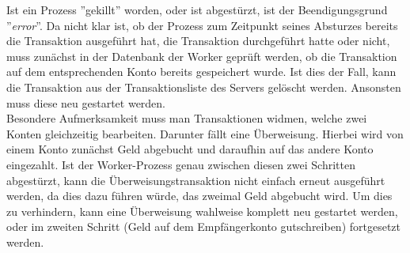 Ist ein Prozess ''gekillt'' worden, oder ist abgestürzt, ist der Beendigungsgrund ''\textit{error}''. Da nicht klar ist, ob der Prozess zum Zeitpunkt seines Absturzes bereits die Transaktion ausgeführt hat, die Transaktion durchgeführt hatte oder nicht, muss zunächst in der Datenbank der Worker geprüft werden, ob die Transaktion auf dem entsprechenden Konto bereits gespeichert wurde. Ist dies der Fall, kann die Transaktion aus der Transaktionsliste des Servers gelöscht werden. Ansonsten muss diese neu gestartet werden.\\
Besondere Aufmerksamkeit muss man Transaktionen widmen, welche zwei Konten gleichzeitig bearbeiten. Darunter fällt eine Überweisung. Hierbei wird von einem Konto zunächst Geld abgebucht und daraufhin auf das andere Konto eingezahlt. Ist der Worker-Prozess genau zwischen diesen zwei Schritten abgestürzt, kann die Überweisungstransaktion nicht einfach erneut ausgeführt werden, da dies dazu führen würde, das zweimal Geld abgebucht wird. Um dies zu verhindern, kann eine Überweisung wahlweise komplett neu gestartet werden, oder im zweiten Schritt (Geld auf dem Empfängerkonto gutschreiben) fortgesetzt werden.
